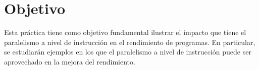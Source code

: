 \section{Objetivo}

Esta práctica tiene como objetivo fundamental ilustrar el impacto que
tiene el paralelismo a nivel de instrucción en el rendimiento de programas.
En particular, se estudiarán ejemplos en los que el paralelismo a nivel
de instrucción puede ser aprovechado en la mejora del rendimiento.
